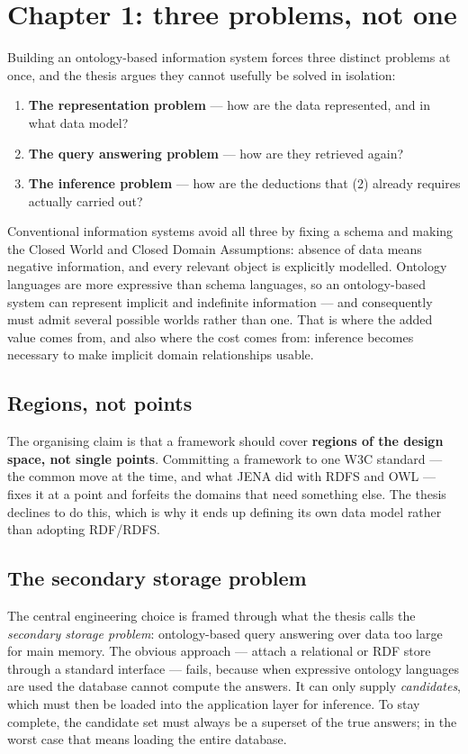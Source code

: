 \documentclass[11pt,a4paper,DIV=12,parskip=half]{scrartcl}
\begin{document}
\section{Chapter 1: three problems, not one}

Building an ontology-based information system forces three distinct problems at
once, and the thesis argues they cannot usefully be solved in isolation:

\begin{enumerate}
\item \textbf{The representation problem} --- how are the data represented, and
  in what data model?
\item \textbf{The query answering problem} --- how are they retrieved again?
\item \textbf{The inference problem} --- how are the deductions that (2)
  already requires actually carried out?
\end{enumerate}

Conventional information systems avoid all three by fixing a schema and making
the Closed World and Closed Domain Assumptions: absence of data means negative
information, and every relevant object is explicitly modelled. Ontology
languages are more expressive than schema languages, so an ontology-based system
can represent implicit and indefinite information --- and consequently must
admit several possible worlds rather than one. That is where the added value
comes from, and also where the cost comes from: inference becomes necessary to
make implicit domain relationships usable.

\subsection{Regions, not points}

The organising claim is that a framework should cover \textbf{regions of the
design space, not single points}. Committing a framework to one W3C standard
--- the common move at the time, and what JENA did with RDFS and OWL --- fixes
it at a point and forfeits the domains that need something else. The thesis
declines to do this, which is why it ends up defining its own data model rather
than adopting RDF/RDFS.

\subsection{The secondary storage problem}

The central engineering choice is framed through what the thesis calls the
\emph{secondary storage problem}: ontology-based query answering over data too
large for main memory. The obvious approach --- attach a relational or RDF store
through a standard interface --- fails, because when expressive ontology
languages are used the database cannot compute the answers. It can only supply
\emph{candidates}, which must then be loaded into the application layer for
inference. To stay complete, the candidate set must always be a superset of the
true answers; in the worst case that means loading the entire database.
\end{document}
